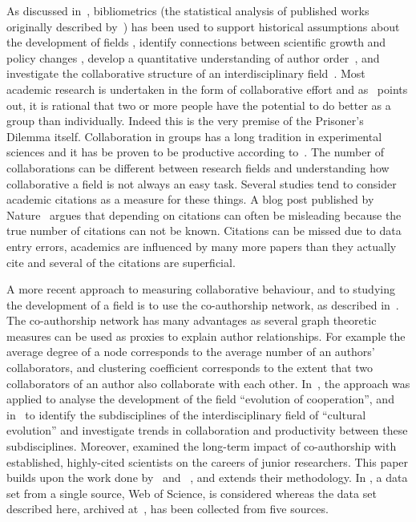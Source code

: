 \documentclass{article}
\theoremstyle{definition}
\begin{document}
As discussed in~\cite{youngblood2018}, bibliometrics (the statistical analysis
of published works originally described by~\cite{pritchard1969}) has been used
to support historical assumptions about the development of fields
\cite{raina1998}, identify connections between scientific growth and policy
changes \cite{das2016}, develop a quantitative understanding of author
order~\cite{sekara2018}, and investigate the collaborative structure of an
interdisciplinary field~\cite{Liu2015}. Most academic research is undertaken in
the form of collaborative effort and as~\cite{Kyvik2017} points out, it is
rational that two or more people have the potential to do better as a group
than individually. Indeed this is the very premise of the Prisoner's Dilemma itself.
Collaboration in groups has a long tradition in experimental
sciences and it has be proven to be productive according
to~\cite{Etzkowitz1992}. The number of collaborations can be different
between research fields and understanding how collaborative a field is not
always an easy task. Several studies tend to consider academic citations as a
measure for these things. A blog post published by Nature~\cite{nature_blog}
argues that depending on citations can often be misleading because the true
number of citations can not be known. Citations can be missed due to data entry
errors, academics are influenced by many more papers than they actually cite and
several of the citations are superficial.

A more recent approach to measuring collaborative behaviour, and to studying the
development of a field is to use the co-authorship network, as described
in~\cite{Liu2015}. The co-authorship network has many advantages as several
graph theoretic measures can be used as proxies to explain author relationships.
For example the average degree of a node corresponds to the average number of
an authors' collaborators, and clustering coefficient corresponds to the extent that
two collaborators of an author also collaborate with each other.
In~\cite{Liu2015}, the approach was applied to analyse the development of the field
``evolution of cooperation'', and in~\cite{youngblood2018} to identify the
subdisciplines of the interdisciplinary field of ``cultural evolution'' and
investigate trends in collaboration and productivity between these subdisciplines.
Moreover, \cite{Li2019} examined the
long-term impact of co-authorship with established, highly-cited scientists on
the careers of junior researchers. This paper builds upon the work done
by~\cite{Liu2015} and ~\cite{youngblood2018}, and extends their methodology.
In \cite{Liu2015, youngblood2018}, a data set from a
single source, Web of Science, is considered whereas the data set described here, archived
at~\cite{pd_data_2018}, has been collected from five sources.
\end{document}

